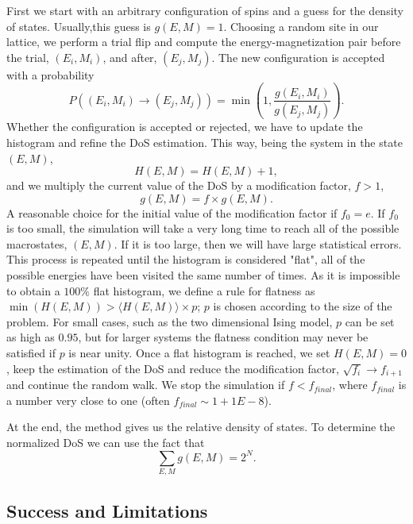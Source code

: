 First we start with an arbitrary configuration of spins and a guess for the density of states. Usually,this  guess is $g(E, M)=1$. Choosing a random site in our lattice, we perform a trial flip and compute the energy-magnetization pair before the trial, $(E_i, M_i)$, and after, $(E_j,M_j)$. The new configuration is accepted with a probability
\begin{equation}
	P((E_i, M_i) \rightarrow (E_j, M_j)) = \min\left(1, \frac{g(E_i, M_i)}{g(E_j, M_j)}\right).
\end{equation}
Whether the configuration is accepted or rejected, we have to update the histogram and refine the DoS estimation. This way, being the system in the state $(E, M)$,
\begin{equation*}
	H(E, M) = H(E,M)+1,
\end{equation*}
and we multiply the current value of the DoS by a modification factor, $f > 1$,
\begin{equation*}
	g(E,M)=f \times g(E,M).
\end{equation*}
A reasonable choice for the initial value of the modification factor if $f_0 = e$. If $f_0$ is too small, the simulation will take a very long time to reach all of the possible macrostates, $(E,M)$. If it is too large, then we will have large statistical errors.  
This process is repeated until the histogram is considered "flat", all of the possible energies have been visited the same number of times. As it is impossible to obtain a $100\%$ flat histogram, we define a rule for flatness as $\min(H(E, M)) > \langle H(E, M) \rangle \times p$; $p$ is chosen according to the size of the problem. For small cases, such as the two dimensional Ising model, $p$ can be set as high as $0.95$, but for larger systems the flatness condition may never be satisfied if $p$ is near unity.  
Once a flat histogram is reached, we set $H(E, M)=0$, keep the estimation of the DoS and reduce the modification factor, $\sqrt{f_{i}} \rightarrow f_{i+1}$ and continue the random walk. We stop the simulation if $f<f_{final}$, where $f_{final}$ is a number very close to one (often $f_{final} \sim 1+1E-8$). 

At the end, the method gives us the relative density of states. To determine the normalized DoS we can use the fact that 
\begin{equation}
	\sum_{E,M} g(E,M) = 2^N.
\end{equation}

\subsection{Success and Limitations}

